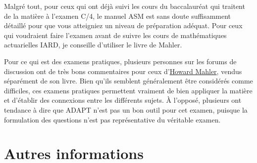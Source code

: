 \documentclass[11pt,french]{article}
\begin{document}
Malgré tout, pour ceux qui ont déjà suivi les cours du baccalauréat qui traitent de la matière à l'examen C/4, le manuel ASM est sans doute suffisamment détaillé pour que vous atteigniez un niveau de préparation adéquat. Pour ceux qui voudraient faire l'examen avant de suivre les cours de mathématiques actuarielles IARD, je conseille d'utiliser le livre de Mahler.\vspace{\baselineskip}

Pour ce qui est des examens pratiques, plusieurs personnes sur les forums de discussion ont de très bons commentaires pour ceux d'\href{http://howardmahler.com/Teaching/C.html}{Howard Mahler}, vendus séparément de son livre. Bien qu'ils semblent généralement être considérés comme difficiles, ces examens pratiques permettent vraiment de bien appliquer la matière et d'établir des connexions entre les différents sujets. À l'opposé, plusieurs ont tendance à dire que ADAPT n'est pas un bon outil pour cet examen, puisque la formulation des questions n'est pas représentative du véritable examen. 






\newpage
\section*{Autres informations}
\label{sec:autres}
\end{document}
